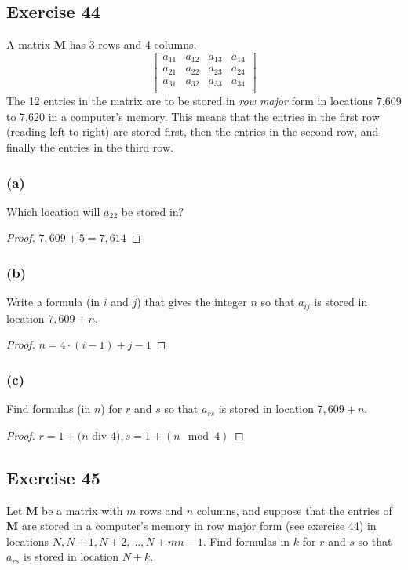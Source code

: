 \documentclass[14pt]{extarticle}
\begin{document}
\subsection{Exercise 44}
A matrix {\bf M} has 3 rows and 4 columns.
\[
\left[
\begin{array}{cccc}
a_{11}&a_{12}&a_{13}&a_{14}\\
a_{21}&a_{22}&a_{23}&a_{24}\\
a_{31}&a_{32}&a_{33}&a_{34}\\
\end{array}
\right]
\]
The 12 entries in the matrix are to be stored in {\it row major} form in locations 7,609 to 7,620 in a computer’s memory. This means that the entries in the first row (reading left to right) are stored first, then the entries in the second row, and finally the entries in the third row.

\subsubsection{(a)}
Which location will $a_{22}$ be stored in?

\begin{proof}
$7,609 + 5 = 7,614$
\end{proof}

\subsubsection{(b)}
Write a formula (in $i$ and $j$) that gives the integer $n$ so that $a_{ij}$ is stored in location $7,609 + n$.

\begin{proof}
$n = 4\cdot (i-1) + j - 1$
\end{proof}

\subsubsection{(c)}
Find formulas (in $n$) for $r$ and $s$ so that $a_{rs}$ is stored in location $7,609 + n$.

\begin{proof}
$r = 1 + (n$ div $4), s = 1 + (n \mod 4)$
\end{proof}

\subsection{Exercise 45}
Let {\bf M} be a matrix with $m$ rows and $n$ columns, and suppose that the entries of {\bf M} are stored in a computer’s memory in row major form (see exercise 44) in locations $N, N + 1, N + 2, \ldots, N + mn - 1$. Find formulas in $k$ for $r$ and $s$ so that $a_{rs}$ is stored in location $N + k$.
\end{document}
